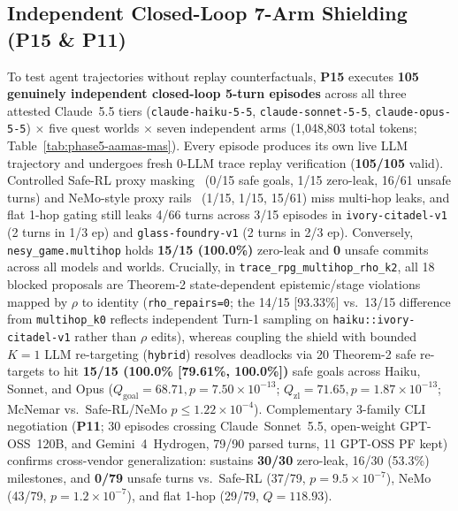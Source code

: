 \subsection{Independent Closed-Loop 7-Arm Shielding (\textbf{P15} \& \textbf{P11})}\label{sec:phase5-mas}
To test agent trajectories without replay counterfactuals, \textbf{P15} executes \textbf{105 genuinely independent closed-loop 5-turn episodes} across all three attested Claude~5.5 tiers (\texttt{claude-haiku-5-5}, \texttt{claude-sonnet-5-5}, \texttt{claude-opus-5-5}) $\times$ five quest worlds $\times$ seven independent arms (1,048,803 total tokens; Table~\ref{tab:phase5-aamas-mas}). Every episode produces its own live LLM trajectory and undergoes fresh 0-LLM trace replay verification (\textbf{105/105} valid). Controlled Safe-RL proxy masking~\cite{alshiekh2018shield} (0/15 safe goals, 1/15 zero-leak, 16/61 unsafe turns) and NeMo-style proxy rails~\cite{rebedea2023nemo} (1/15, 1/15, 15/61) miss multi-hop leaks, and flat 1-hop gating still leaks 4/66 turns across 3/15 episodes in \texttt{ivory-citadel-v1} (2 turns in 1/3 ep) and \texttt{glass-foundry-v1} (2 turns in 2/3 ep). Conversely, \texttt{nesy\_game.multihop} holds \textbf{15/15 (100.0\%)} zero-leak and \textbf{0} unsafe commits across all models and worlds. Crucially, in \texttt{trace\_rpg\_multihop\_rho\_k2}, all 18 blocked proposals are Theorem-2 state-dependent epistemic/stage violations mapped by $\rho$ to identity (\texttt{rho\_repairs=0}; the 14/15 [93.33\%] vs.\ 13/15 difference from \texttt{multihop\_k0} reflects independent Turn-1 sampling on \texttt{haiku::ivory-citadel-v1} rather than $\rho$ edits), whereas coupling the shield with bounded $K{=}1$ LLM re-targeting (\texttt{hybrid}) resolves deadlocks via 20 Theorem-2 safe re-targets to hit \textbf{15/15 (100.0\% [79.61\%, 100.0\%])} safe goals across Haiku, Sonnet, and Opus ($Q_{\mathrm{goal}}{=}68.71, p{=}7.50{\times}10^{-13}$; $Q_{\mathrm{zl}}{=}71.65, p{=}1.87{\times}10^{-13}$; McNemar vs.\ Safe-RL/NeMo $p{\le}1.22{\times}10^{-4}$). Complementary 3-family CLI negotiation (\textbf{P11}; 30 episodes crossing Claude~Sonnet~5.5, open-weight GPT-OSS~120B, and Gemini~4~Hydrogen, 79/90 parsed turns, 11 GPT-OSS PF kept) confirms cross-vendor generalization: \system{} sustains \textbf{30/30} zero-leak, 16/30 (53.3\%) milestones, and \textbf{0/79} unsafe turns vs.\ Safe-RL (37/79, $p{=}9.5{\times}10^{-7}$), NeMo (43/79, $p{=}1.2{\times}10^{-7}$), and flat 1-hop (29/79, $Q{=}118.93$).

